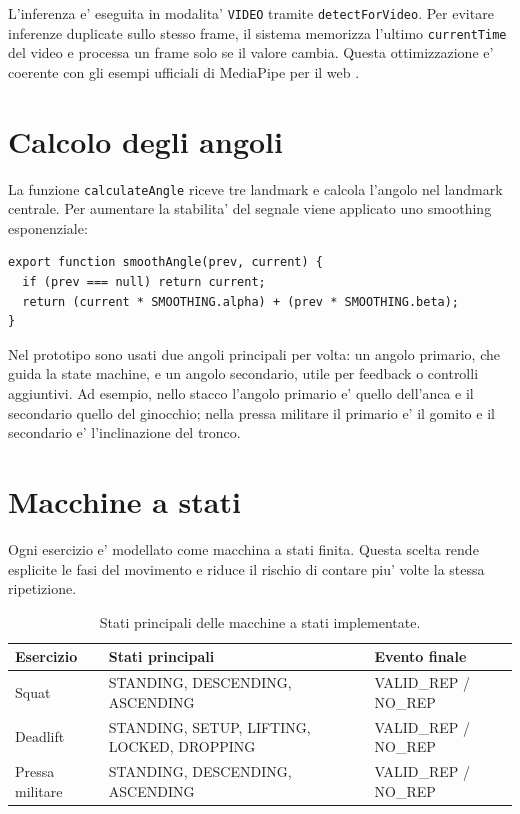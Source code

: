 L'inferenza e' eseguita in modalita' \texttt{VIDEO} tramite \texttt{detectForVideo}. Per evitare inferenze duplicate sullo stesso frame, il sistema memorizza l'ultimo \texttt{currentTime} del video e processa un frame solo se il valore cambia. Questa ottimizzazione e' coerente con gli esempi ufficiali di MediaPipe per il web \cite{mediapipePoseWeb2026}.

\section{Calcolo degli angoli}

La funzione \texttt{calculateAngle} riceve tre landmark e calcola l'angolo nel landmark centrale. Per aumentare la stabilita' del segnale viene applicato uno smoothing esponenziale:

\begin{lstlisting}
export function smoothAngle(prev, current) {
  if (prev === null) return current;
  return (current * SMOOTHING.alpha) + (prev * SMOOTHING.beta);
}
\end{lstlisting}

Nel prototipo sono usati due angoli principali per volta: un angolo primario, che guida la state machine, e un angolo secondario, utile per feedback o controlli aggiuntivi. Ad esempio, nello stacco l'angolo primario e' quello dell'anca e il secondario quello del ginocchio; nella pressa militare il primario e' il gomito e il secondario e' l'inclinazione del tronco.

\section{Macchine a stati}

Ogni esercizio e' modellato come macchina a stati finita. Questa scelta rende esplicite le fasi del movimento e riduce il rischio di contare piu' volte la stessa ripetizione.

\begin{table}[htbp]
\myfloatalign
\begin{tabular}{lll}
\toprule
Esercizio & Stati principali & Evento finale \\
\midrule
Squat & STANDING, DESCENDING, ASCENDING & VALID\_REP / NO\_REP \\
Deadlift & STANDING, SETUP, LIFTING, LOCKED, DROPPING & VALID\_REP / NO\_REP \\
Pressa militare & STANDING, DESCENDING, ASCENDING & VALID\_REP / NO\_REP \\
\bottomrule
\end{tabular}
\caption{Stati principali delle macchine a stati implementate.}
\label{tab:states}
\end{table}

